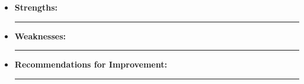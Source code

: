 \documentclass[
  10pt,
]{article}
\begin{document}
\begin{itemize}
\item
  \textbf{Strengths:}

  \begin{center}\rule{0.5\linewidth}{0.5pt}\end{center}
\item
  \textbf{Weaknesses:}

  \begin{center}\rule{0.5\linewidth}{0.5pt}\end{center}
\item
  \textbf{Recommendations for Improvement:}

  \begin{center}\rule{0.5\linewidth}{0.5pt}\end{center}
\end{itemize}
\end{document}
